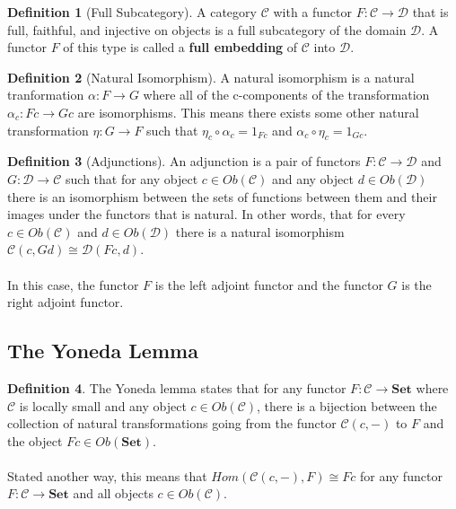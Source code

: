 \documentclass{article}
\theoremstyle{definition}
\newtheorem{definition}{Definition}
\begin{document}
\begin{definition}[Full Subcategory]
    A category $\mathcal{C}$ with a functor $F:\mathcal{C}\rightarrow\mathcal{D}$ that is full, faithful, and injective on objects is a full subcategory of the domain $\mathcal{D}$.
    A functor $F$ of this type is called a \textbf{full embedding} of $\mathcal{C}$ into $\mathcal{D}$.
\end{definition}


\begin{definition}[Natural Isomorphism]
    A natural isomorphism is a natural tranformation $\alpha:F\rightarrow G$ where all of the c-components of the transformation $\alpha_{c}:Fc\rightarrow Gc$ are isomorphisms.
    This means there exists some other natural transformation $\eta:G\rightarrow F$ such that $\eta_c\circ\alpha_c = 1_{Fc}$ and $\alpha_c\circ\eta_c = 1_{Gc}$.
\end{definition}


\begin{definition}[Adjunctions]
    An adjunction is a pair of functors $F:\mathcal{C}\rightarrow\mathcal{D}$ and $G:\mathcal{D}\rightarrow\mathcal{C}$ such that for any object $c\in Ob(\mathcal{C})$ and any object $d\in Ob(\mathcal{D})$ there is an isomorphism between the sets of functions between them and their images under the functors that is natural.
    In other words, that for every $c\in Ob(\mathcal{C})$ and $d\in Ob(\mathcal{D})$ there is a natural isomorphism $\mathcal{C}(c,Gd)\cong\mathcal{D}(Fc,d)$.\\\\
    In this case, the functor $F$ is the left adjoint functor and the functor $G$ is the right adjoint functor.
\end{definition}


\subsection*{The Yoneda Lemma}
\begin{definition}
    The Yoneda lemma states that for any functor $F:\mathcal{C}\rightarrow\mathbf{Set}$ where $\mathcal{C}$ is locally small and any object $c\in Ob(\mathcal{C})$, there is a bijection between the collection of natural transformations going from the functor $\mathcal{C}(c,-)$ to $F$ and the object $Fc\in Ob(\mathbf{Set})$.
    \\\\Stated another way, this means that $Hom(\mathcal{C}(c,-), F)\cong Fc$ for any functor $F:\mathcal{C}\rightarrow\mathbf{Set}$ and all objects $c\in Ob(\mathcal{C})$.

\end{definition}
\end{document}
